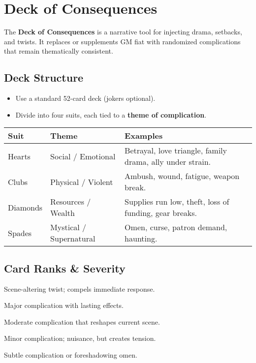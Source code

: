 

\section{Deck of Consequences}
\label{sec:deck-consequences}

The \textbf{Deck of Consequences} is a narrative tool for injecting drama, setbacks, and twists. It replaces or supplements GM fiat with randomized complications that remain thematically consistent.

\subsection{Deck Structure}
\begin{itemize}
  \item Use a standard 52-card deck (jokers optional).
  \item Divide into four suits, each tied to a \textbf{theme of complication}.
\end{itemize}

\begin{center}
\begin{tabular}{@{}llp{8cm}@{}}
\toprule
\textbf{Suit} & \textbf{Theme} & \textbf{Examples} \\
\midrule
Hearts & Social / Emotional & Betrayal, love triangle, family drama, ally under strain. \\
Clubs & Physical / Violent  & Ambush, wound, fatigue, weapon break. \\
Diamonds & Resources / Wealth & Supplies run low, theft, loss of funding, gear breaks. \\
Spades & Mystical / Supernatural & Omen, curse, patron demand, haunting. \\
\bottomrule
\end{tabular}
\end{center}

\subsection{Card Ranks \& Severity}
\begin{description}[leftmargin=1.5em, style=nextline]
  \item[Ace:] Scene-altering twist; compels immediate response.
  \item[King/Queen/Jack:] Major complication with lasting effects.
  \item[10--8:] Moderate complication that reshapes current scene.
  \item[7--5:] Minor complication; nuisance, but creates tension.
  \item[4--2:] Subtle complication or foreshadowing omen.
\end{description}

